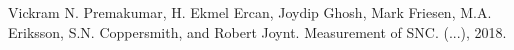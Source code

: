 \documentclass[letterpaper]{article}
\numberwithin{equation}{section} %
\numberwithin{figure}{section} %
\numberwithin{table}{section} %
\begin{document}

\begin{thebibliography}{9}
	Vickram N. Premakumar, H. Ekmel Ercan, Joydip Ghosh, Mark Friesen, M.A. Eriksson, S.N. Coppersmith, and Robert Joynt. 
	Measurement of SNC. 
	(...), 2018.
\end{thebibliography}
\end{document}
